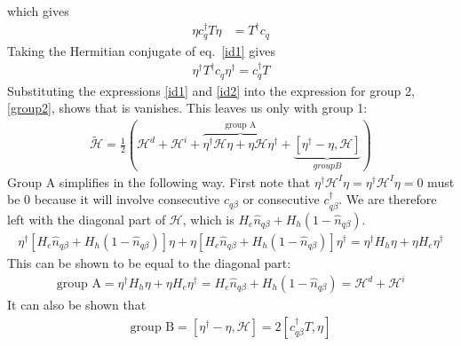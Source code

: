 which gives
\begin{equation}\begin{aligned}
	\label{id1}
 \eta c_q^\dagger  T \eta  &= T^\dagger c_q 
\end{aligned}\end{equation}
Taking the Hermitian conjugate of eq.~\ref{id1} gives
\begin{equation}\begin{aligned}
	\label{id2}
\eta^\dagger T^\dagger c_q \eta^\dagger = c_q^\dagger T
\end{aligned}\end{equation}
Substituting the expressions \ref{id1} and \ref{id2} into the expression for group 2, \ref{group2}, shows that is vanishes. This leaves us only with group 1:
\begin{equation}\begin{aligned}
	\widetilde{\mathcal{H}} = \frac{1}{2}\left(\mathcal{H}^d + \mathcal{H}^i + \overbrace{\eta^\dagger\mathcal{H}\eta + \eta \mathcal{H} \eta^\dagger}^\text{group A} + \underbrace{\left[\eta^\dagger - \eta,\mathcal{H}\right]}_{group B}\right)
\end{aligned}\end{equation}
Group A simplifies in the following way. First note that \(\eta^\dagger \mathcal{H}^I \eta = \eta^\dagger \mathcal{H}^I \eta = 0\) must be 0 because it will involve consecutive \(c_{q\beta}\) or  consecutive \(c^\dagger_{q\beta}\). We are therefore left with the diagonal part of \(\mathcal{H}\), which is \(H_e \hat  n_{q\beta} + H_h \left(1 - \hat n_{q\beta}\right)\).
\begin{equation}\begin{aligned}
	\eta^\dagger\left[H_e \hat  n_{q\beta} + H_h \left(1 - \hat n_{q\beta}\right)\right]\eta + \eta\left[H_e \hat  n_{q\beta} + H_h \left(1 - \hat n_{q\beta}\right)\right]\eta^\dagger = \eta^\dagger H_h \eta + \eta H_e \eta^\dagger
\end{aligned}\end{equation}
This can be shown to be equal to the diagonal part:
\begin{equation}\begin{aligned}
	\text{group A} = \eta^\dagger H_h \eta + \eta H_e \eta^\dagger = H_e \hat n_{q\beta} + H_h\left(1 - \hat n_{q\beta}\right) = \mathcal{H}^d + \mathcal{H}^i
\end{aligned}\end{equation}
It can also be shown that
\begin{equation}\begin{aligned}
	\label{group B}
	\text{group B} = \left[\eta^\dagger - \eta,\mathcal{H}\right] = 2\left[c^\dagger_{q\beta} T,\eta\right]
\end{aligned}\end{equation}
